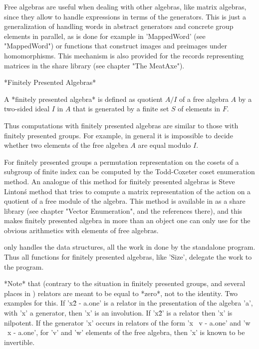 Free algebras are useful when dealing with other algebras, like matrix
algebras, since they allow to handle expressions in terms of the generators.
This is just a generalization of handling words in abstract generators and
concrete group elements in parallel, as is done for example in 'MappedWord'
(see "MappedWord") or functions that construct images and preimages under
homomorphisms.  This mechanism is also provided for the records representing
matrices in the {\MeatAxe} share library (see chapter "The MeatAxe").

\vspace{3mm}

*Finitely Presented Algebras*

A *finitely presented algebra* is defined as quotient $A / I$ of a free
algebra $A$ by a two-sided ideal $I$ in $A$ that is generated by a finite set
$S$ of elements in $F$.

Thus computations with finitely presented algebras are similar to those
with finitely presented groups.  For example, in general it is impossible to
decide whether two elements of the free algebra $A$ are equal modulo $I$.

For finitely presented groups a permutation representation on the cosets
of a subgroup of finite index can be computed by the Todd-Coxeter coset
enumeration method.  An analogue of this method for finitely presented
algebras is Steve Linton\'s {\VE} method that tries to compute a matrix
representation of the action on a quotient of a free module of the algebra.
This method is available in {\GAP} as a share library (see chapter
"Vector Enumeration", and the references there), and this makes
finitely presented algebra in {\GAP} more than an object one can only use
for the obvious arithmetics with elements of free algebras.

{\GAP} only handles the data structures, all the work in done by
the standalone program.  Thus all functions for finitely presented algebras,
like 'Size', delegate the work to the {\VE} program.

*Note* that (contrary to the situation in finitely presented groups, and
several places in {\VE}) relators are meant to be equal to *zero*, not to
the identity.  Two examples for this.  If 'x\^2 - a.one' is a relator in
the presentation of the algebra 'a', with 'x' a generator, then 'x' is an
involution.  If 'x\^2' is a relator then 'x' is nilpotent.  If the generator
'x' occurs in relators of the form 'x \*\ v - a.one' and 'w \*\ x - a.one',
for 'v' and 'w' elements of the free algebra, then 'x' is known to be
invertible.


